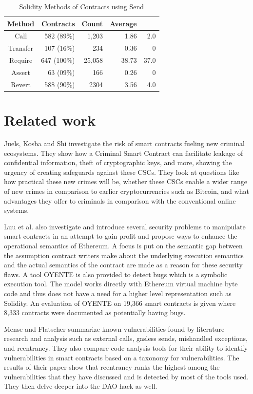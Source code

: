 \documentclass[10pt,conference]{IEEEtran}
\begin{document}
\begin{table}
\center
  \caption{Solidity Methods of Contracts using Send}
  \label{tab:send}
  \begin{tabular}{crrrr}
    \hline
    Method & Contracts & Count & Average \\
    \hline
    Call& 582 (89\%) & 1,203 & 1.86 & 2.0\\
    Transfer& 107 (16\%) & 234 & 0.36 & 0\\
    Require& 647 (100\%) & 25,058 & 38.73 & 37.0\\
    Assert& 63 (09\%) & 166 & 0.26 & 0\\
    Revert& 588 (90\%) & 2304 & 3.56 & 4.0\\
    \hline
\end{tabular}
\end{table}


\section{Related work}


Juels, Kosba and Shi\cite{criminal} investigate the risk of smart contracts fueling new criminal ecosystems. They show how a Criminal Smart Contract can facilitate leakage of confidential information, theft of cryptographic keys, and more, showing the urgency of creating safeguards against these CSCs. They look at questions like how practical these new crimes will be, whether these CSCs enable a wider range of new crimes in comparison to earlier cryptocurrencies such as Bitcoin, and what advantages they offer to criminals in comparison with the conventional online systems.


Luu et al.  \cite{smarter} also investigate and introduce several security problems to manipulate smart contracts in an attempt to gain profit and propose ways to enhance the operational semantics of Ethereum. A focus is put on the semantic gap between the assumption contract writers make about the underlying execution semantics and the actual semantics of the contract are made as a reason for these security flaws. A tool OYENTE is also provided to detect bugs which is a symbolic execution tool. The model works directly with Ethereum virtual machine byte code and thus does not have a need for a higher level representation such as Solidity. An evaluation of OYENTE on 19,366 smart contracts is given where 8,333 contracts were documented as potentially having bugs.

Mense and Flatscher \cite{security} summarize known vulnerabilities found by literature research and analysis such as external calls, gasless sends, mishandled exceptions, and reentrancy. They also compare code analysis tools for their ability to identify vulnerabilities in smart contracts based on a taxonomy for vulnerabilities. The results of their paper show that reentrancy ranks the highest among the vulnerabilities that they have discussed and is detected by most of the tools used. They then delve deeper into the DAO hack as well.
\end{document}
